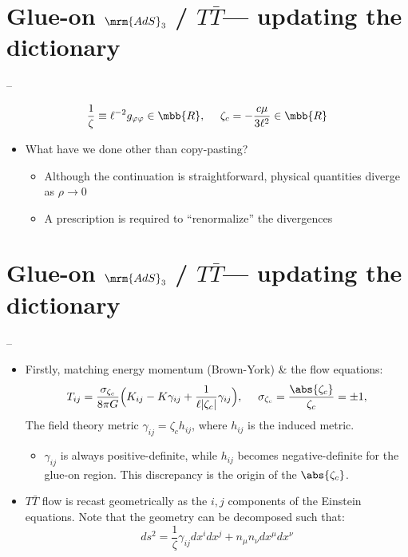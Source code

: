 \documentclass[10pt]{article}
\renewenvironment{frame}[1]%
	{\section*{#1}}%
	{\clearpage}
\newcommand{\pause}{}
\newenvironment{columns}%
	{\par\begin{minipage}{\textwidth}}%
	{\end{minipage}}
\newenvironment{column}[1]%
	{\begin{minipage}{#1}}%
	{\end{minipage}}
\newcommand{\TTbar}{\texorpdfstring{\ensuremath{T\bar{T}}}{TTbar}\xspace}
\begin{document}
\begin{frame}{Glue-on $\mrm{AdS}_3$ / \TTbar --- updating the dictionary}{%
	\textcite{Apolo:2023vnm} -- 
}
\begin{columns}
\figGlueon
\begin{column}{.6\textwidth}
\begin{equation}
	\frac{1}{\zeta} \equiv \ell^{-2} g_{\varphi\varphi} \in \mbb{R},
\ \quad
	\zeta_c = - \frac{c \mu}{3\ell^2} \in \mbb{R}
\end{equation}
\begin{itemize}
\item What have we done other than copy-pasting?
	\begin{itemize}
	\item Although the continuation is straightforward, physical quantities diverge as $\rho \to 0$
	
	\item A prescription is required to ``renormalize'' the divergences
	\end{itemize}
	
\end{itemize}
\end{column}
\end{columns}
\end{frame}

\begin{frame}{Glue-on $\mrm{AdS}_3$ / \TTbar --- updating the dictionary}{%
	\textcite{Kraus:2018xrn} -- 
}
\begin{itemize}
\item Firstly, matching energy momentum (Brown-York) \& the flow equations:
	\begin{equation}
		T_{ij}= \frac{\sigma_{\zeta_c}}{8\pi G} \Big( K_{ij} -  K \gamma_{ij} + \frac{1}{\ell |\zeta_c|}\gamma_{ij}\Big), \ \quad \sigma_{\zeta_c} = \frac{\abs{\zeta_c}}{\zeta_c} = \pm 1,
		\label{BYtensor}
	\end{equation}
	The field theory metric $\gamma_{ij} = \zeta_c h_{ij}$, where $h_{ij}$ is the induced metric.
	
	\pause
	
	\begin{itemize}
	\item $\gamma_{ij}$ is always positive-definite, while $h_{ij}$ becomes negative-definite for the glue-on region.
	This discrepancy is the origin of the $\abs{\zeta_c}$.
	\end{itemize}
	
	\pause
	
\item \TTbar flow is recast geometrically as the $i,j$ components of the Einstein equations. 
Note that the geometry can be decomposed such that:
	\begin{equation}
		ds^2 = \frac{1}{\zeta} \gamma_{ij}dx^i dx^j+n_\mu n_\nu dx^\mu dx^\nu
	\end{equation}
\end{itemize}
\end{frame}
\end{document}
